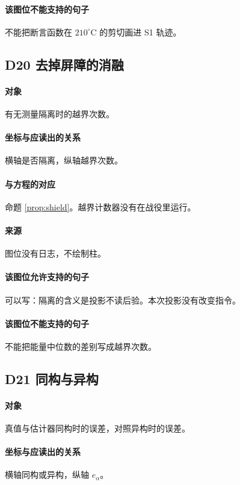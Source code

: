 \paragraph{该图位不能支持的句子}
不能把断言函数在 $210^\circ\mathrm{C}$ 的剪切画进 S1 轨迹。

\subsection{D20 去掉屏障的消融}
\paragraph{对象}
有无测量隔离时的越界次数。

\paragraph{坐标与应读出的关系}
横轴是否隔离，纵轴越界次数。

\paragraph{与方程的对应}
命题 \ref{prop:shield}。越界计数器没有在战役里运行。

\paragraph{来源}
图位没有日志，不绘制柱。

\paragraph{该图位允许支持的句子}
可以写：隔离的含义是投影不读后验。本次投影没有改变指令。

\paragraph{该图位不能支持的句子}
不能把能量中位数的差别写成越界次数。

\subsection{D21 同构与异构}
\paragraph{对象}
真值与估计器同构时的误差，对照异构时的误差。

\paragraph{坐标与应读出的关系}
横轴同构或异构，纵轴 $e_\alpha$。

